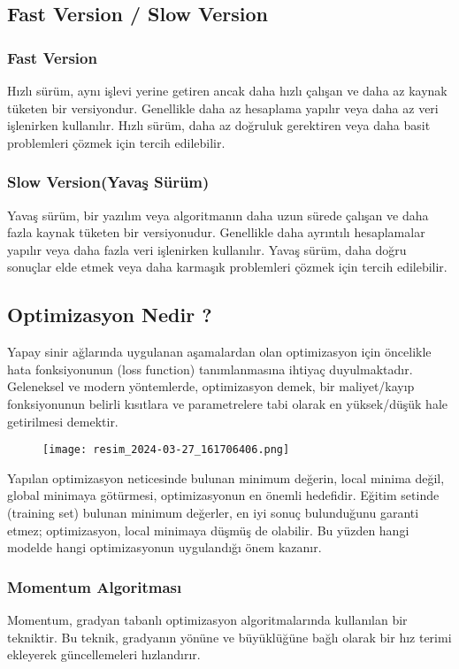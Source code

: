 \documentclass[12pt]{article}
\begin{document}
\subsection{Fast Version / Slow Version}
\subsubsection{Fast Version}

Hızlı sürüm, aynı işlevi yerine getiren ancak daha hızlı çalışan ve daha az kaynak tüketen bir versiyondur.
Genellikle daha az hesaplama yapılır veya daha az veri işlenirken kullanılır.
Hızlı sürüm, daha az doğruluk gerektiren veya daha basit problemleri çözmek için tercih edilebilir.
\subsubsection{Slow Version(Yavaş Sürüm)}

Yavaş sürüm, bir yazılım veya algoritmanın daha uzun sürede çalışan ve daha fazla kaynak tüketen bir versiyonudur.
Genellikle daha ayrıntılı hesaplamalar yapılır veya daha fazla veri işlenirken kullanılır.
Yavaş sürüm, daha doğru sonuçlar elde etmek veya daha karmaşık problemleri çözmek için tercih edilebilir.
\subsection{Optimizasyon Nedir ?}
Yapay sinir ağlarında uygulanan aşamalardan olan optimizasyon için öncelikle hata fonksiyonunun (loss function) tanımlanmasına ihtiyaç duyulmaktadır. Geleneksel ve modern yöntemlerde, optimizasyon demek, bir maliyet/kayıp fonksiyonunun belirli kısıtlara ve parametrelere tabi olarak en yüksek/düşük hale getirilmesi demektir.\cite{seyyarer2020derin}
\begin{figure}[h]
    \centering
    \texttt{[image: resim\_2024-03-27\_161706406.png]}
    \label{fig:enter-label}
\end{figure} 
Yapılan optimizasyon neticesinde bulunan minimum değerin, local minima değil, global minimaya götürmesi, optimizasyonun en önemli hedefidir. Eğitim setinde (training set) bulunan minimum değerler, en iyi sonuç bulunduğunu garanti etmez; optimizasyon, local minimaya düşmüş de olabilir. Bu yüzden hangi modelde hangi optimizasyonun uygulandığı önem kazanır.
\subsubsection{Momentum Algoritması}
Momentum, gradyan tabanlı optimizasyon algoritmalarında kullanılan bir tekniktir. Bu teknik, gradyanın yönüne ve büyüklüğüne bağlı olarak bir hız terimi ekleyerek güncellemeleri hızlandırır.
\end{document}
